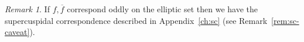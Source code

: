 \documentclass[12pt,letterpaper,openany]{book}
\theoremstyle{plain}
\theoremstyle{definition}
\theoremstyle{remark}
\newtheorem{remark}[theorem]{Remark}
\theoremstyle{remark}
\begin{document}
\begin{remark} If $f,\overline{f}$ correspond oddly on the elliptic set
then we have the supercuspidal
correspondence described in Appendix~\ref{ch:sc} (see Remark~\ref{rem:sc-caveat}).
\end{remark}


















\end{document}
